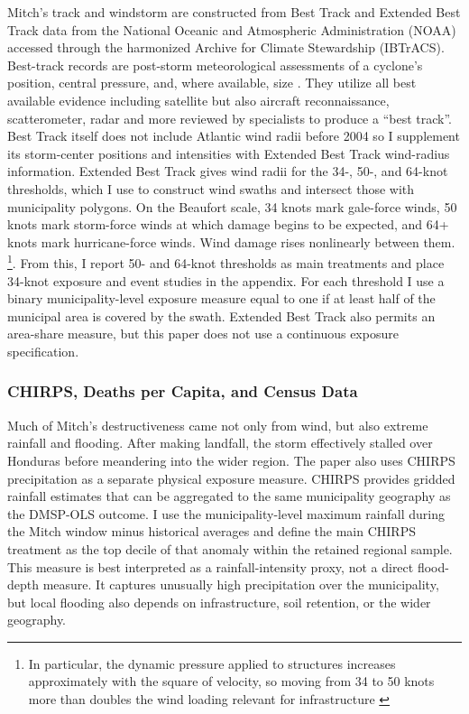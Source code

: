 \documentclass[12pt]{article}
\begin{document}
Mitch's track and windstorm are constructed from Best Track and Extended Best Track data from the National Oceanic and Atmospheric Administration (NOAA) accessed through the harmonized Archive for Climate Stewardship (IBTrACS). Best-track records are post-storm meteorological assessments of a cyclone's position, central pressure, and, where available, size \parencite{landsea2013atlantic}. They utilize all best available evidence including satellite but also aircraft reconnaissance, scatterometer, radar and more reviewed by specialists to produce a ``best track''. Best Track itself does not include Atlantic wind radii before 2004 so I supplement its storm-center positions and intensities with Extended Best Track wind-radius information. Extended Best Track gives wind radii for the 34-, 50-, and 64-knot thresholds, which I use to construct wind swaths and intersect those with municipality polygons. On the Beaufort scale, 34 knots mark gale-force winds, 50 knots mark storm-force winds at which damage begins to be expected, and 64+ knots mark hurricane-force winds. Wind damage rises nonlinearly between them. \footnote{In particular, the dynamic pressure applied to structures increases approximately with the square of velocity, so moving from 34 to 50 knots more than doubles the wind loading relevant for infrastructure \parencite{nhc2017product}}. From this, I report 50- and 64-knot thresholds as main treatments and place 34-knot exposure and event studies in the appendix. For each threshold I use a binary municipality-level exposure measure equal to one if at least half of the municipal area is covered by the swath. Extended Best Track also permits an area-share measure, but this paper does not use a continuous exposure specification.

\subsubsection{CHIRPS, Deaths per Capita, and Census Data}

Much of Mitch's destructiveness came not only from wind, but also extreme rainfall and flooding. After making landfall, the storm effectively stalled over Honduras before meandering into the wider region. The paper also uses CHIRPS precipitation as a separate physical exposure measure. CHIRPS provides gridded rainfall estimates that can be aggregated to the same municipality geography as the DMSP-OLS outcome. I use the municipality-level maximum rainfall during the Mitch window minus historical averages and define the main CHIRPS treatment as the top decile of that anomaly within the retained regional sample. This measure is best interpreted as a rainfall-intensity proxy, not a direct flood-depth measure. It captures unusually high precipitation over the municipality, but local flooding also depends on infrastructure, soil retention, or the wider geography.
\end{document}
